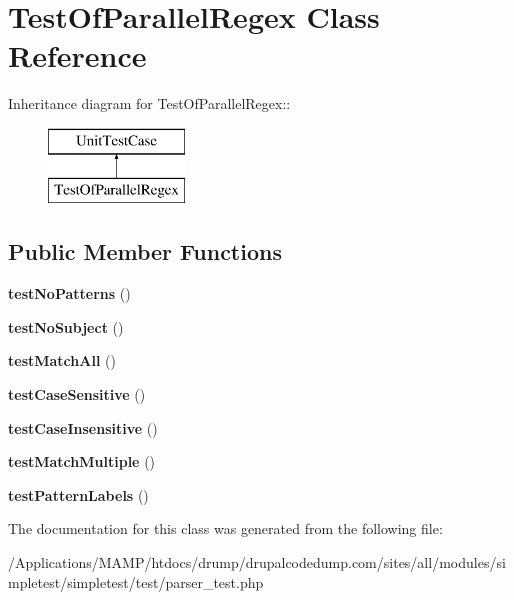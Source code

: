 \hypertarget{class_test_of_parallel_regex}{
\section{TestOfParallelRegex Class Reference}
\label{class_test_of_parallel_regex}
}
Inheritance diagram for TestOfParallelRegex::\begin{figure}[H]
\begin{center}
\leavevmode
\includegraphics[height=2cm]{class_test_of_parallel_regex}
\end{center}
\end{figure}
\subsection*{Public Member Functions}
\begin{DoxyCompactItemize}
\item 
\hypertarget{class_test_of_parallel_regex_a678f7cccc04d42d444c68fb62c8dd6ba}{
{\bfseries testNoPatterns} ()}
\label{class_test_of_parallel_regex_a678f7cccc04d42d444c68fb62c8dd6ba}

\item 
\hypertarget{class_test_of_parallel_regex_a2b24d1b3130c061e4a88b7b43e609355}{
{\bfseries testNoSubject} ()}
\label{class_test_of_parallel_regex_a2b24d1b3130c061e4a88b7b43e609355}

\item 
\hypertarget{class_test_of_parallel_regex_a0c3b6b712588dee60934b0be182c33a3}{
{\bfseries testMatchAll} ()}
\label{class_test_of_parallel_regex_a0c3b6b712588dee60934b0be182c33a3}

\item 
\hypertarget{class_test_of_parallel_regex_ad2f21fe28a75a6592f90046ebc5b98e4}{
{\bfseries testCaseSensitive} ()}
\label{class_test_of_parallel_regex_ad2f21fe28a75a6592f90046ebc5b98e4}

\item 
\hypertarget{class_test_of_parallel_regex_a9d9be08e5f97194d4cf4cc538770ce30}{
{\bfseries testCaseInsensitive} ()}
\label{class_test_of_parallel_regex_a9d9be08e5f97194d4cf4cc538770ce30}

\item 
\hypertarget{class_test_of_parallel_regex_a373968ddbf8e6caec48d413833d621bb}{
{\bfseries testMatchMultiple} ()}
\label{class_test_of_parallel_regex_a373968ddbf8e6caec48d413833d621bb}

\item 
\hypertarget{class_test_of_parallel_regex_a0126ffe772d9ec6b7cdbbcace13702ab}{
{\bfseries testPatternLabels} ()}
\label{class_test_of_parallel_regex_a0126ffe772d9ec6b7cdbbcace13702ab}

\end{DoxyCompactItemize}


The documentation for this class was generated from the following file:\begin{DoxyCompactItemize}
\item 
/Applications/MAMP/htdocs/drump/drupalcodedump.com/sites/all/modules/simpletest/simpletest/test/parser\_\-test.php\end{DoxyCompactItemize}
